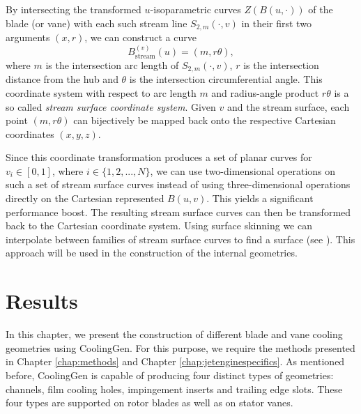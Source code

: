 \documentclass[a4paper, 11pt]{report}
\theoremstyle{definition}
\renewcommand{\emph}[1]{\textit{#1}}
\begin{document}
	By intersecting the transformed $u$-isoparametric curves $Z(B(u,\cdot))$ of the blade (or vane) with each such stream line $S_{2,m}(\cdot, v)$ in their first two arguments $(x,r)$, we can construct a curve
		$$ B^{(v)}_\textrm{stream}(u) = (m, r\theta),$$
	where $m$ is the intersection arc length of $S_{2,m}(\cdot, v)$, $r$ is the intersection distance from the hub and $\theta$ is the intersection circumferential angle. This coordinate system with respect to arc length $m$ and radius-angle product $r\theta$ is a so called \emph{stream surface coordinate system}. Given $v$ and the stream surface, each point $(m, r\theta)$ can bijectively be mapped back onto the respective Cartesian coordinates $(x, y, z)$.

	Since this coordinate transformation produces a set of planar curves for $v_i \in [0,1]$, where $i \in \{1, 2, ..., N\}$, we can use two-dimensional operations on such a set of stream surface curves instead of using three-dimensional operations directly on the Cartesian represented $B(u,v)$. This yields a significant performance boost. The resulting stream surface curves can then be transformed back to the Cartesian coordinate system. Using surface skinning we can interpolate between families of stream surface curves to find a surface (see \cite{Piegl1997}). This approach will be used in the construction of the internal geometries.

\chapter{Results}
	In this chapter, we present the construction of different blade and vane cooling geometries using CoolingGen. For this purpose, we require the methods presented in Chapter \ref{chap:methods} and Chapter \ref{chap:jetenginespecifics}. As mentioned before, CoolingGen is capable of producing four distinct types of geometries: channels, film cooling holes, impingement inserts and trailing edge slots. These four types are supported on rotor blades as well as on stator vanes.
 	
\end{document}
